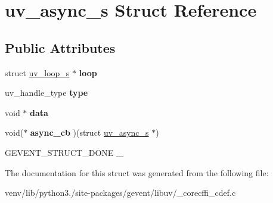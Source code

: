 \hypertarget{structuv__async__s}{}\section{uv\+\_\+async\+\_\+s Struct Reference}
\label{structuv__async__s}
\subsection*{Public Attributes}
\begin{DoxyCompactItemize}
\item 
\mbox{\label{structuv__async__s_abbdb7e035834b465e2acb0b1057ed6b7}} 
struct \hyperlink{structuv__loop__s}{uv\+\_\+loop\+\_\+s} $\ast$ {\bfseries loop}
\item 
\mbox{\label{structuv__async__s_a31c00f1dc425507e4a54ed94eb7ad123}} 
uv\+\_\+handle\+\_\+type {\bfseries type}
\item 
\mbox{\label{structuv__async__s_a09399bc1a48674848fe2acec04767288}} 
void $\ast$ {\bfseries data}
\item 
\mbox{\label{structuv__async__s_a845a01902d420c227e42f09dd2d3196c}} 
void($\ast$ {\bfseries async\+\_\+cb} )(struct \hyperlink{structuv__async__s}{uv\+\_\+async\+\_\+s} $\ast$)
\item 
\mbox{\label{structuv__async__s_a00596047f5f216db807eb8e7502a18da}} 
G\+E\+V\+E\+N\+T\+\_\+\+S\+T\+R\+U\+C\+T\+\_\+\+D\+O\+NE {\bfseries \+\_\+}
\end{DoxyCompactItemize}


The documentation for this struct was generated from the following file\+:\begin{DoxyCompactItemize}
\item 
venv/lib/python3./site-\/packages/gevent/libuv/\+\_\+corecffi\+\_\+cdef.\+c\end{DoxyCompactItemize}
